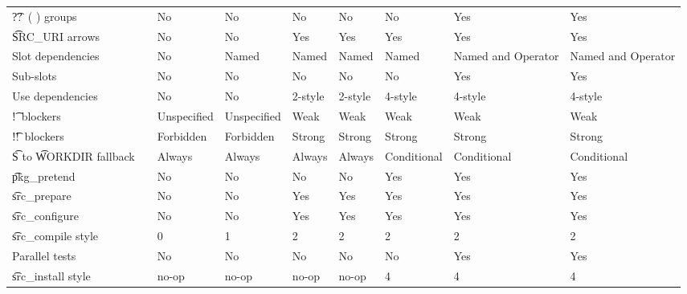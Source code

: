 \begin{landscape}
\begin{longtable}{llP{5em}P{5em}P{6em}P{6em}P{6em}P{6em}P{6em}}
\t{??\ ( )} groups &  &
    No & No & No & No & No & Yes & Yes \\

\t{SRC\_URI} arrows &  &
    No & No & Yes & Yes & Yes & Yes & Yes \\

Slot dependencies &  &
    No & Named & Named & Named & Named & Named and Operator & Named and Operator \\

Sub-slots &  &
    No & No & No & No & No & Yes & Yes \\

Use dependencies &  &
    No & No & 2-style & 2-style & 4-style & 4-style & 4-style \\

\t{!}\ blockers &  &
    Unspecified & Unspecified & Weak & Weak & Weak & Weak & Weak \\

\t{!!}\ blockers &  &
    Forbidden & Forbidden & Strong & Strong & Strong & Strong & Strong \\

\t{S} to \t{WORKDIR} fallback &  &
    Always & Always & Always & Always & Conditional & Conditional & Conditional \\

\t{pkg\_pretend} &  &
    No & No & No & No & Yes & Yes & Yes \\

\t{src\_prepare} &  &
    No & No & Yes & Yes & Yes & Yes & Yes \\

\t{src\_configure} &  &
    No & No & Yes & Yes & Yes & Yes & Yes \\

\t{src\_compile} style &  &
    0 & 1 & 2 & 2 & 2 & 2 & 2 \\

Parallel tests &  &
    No & No & No & No & No & Yes & Yes \\

\t{src\_install} style &  &
    no-op & no-op & no-op & no-op & 4 & 4 & 4 \\


\end{longtable}
\end{landscape}
